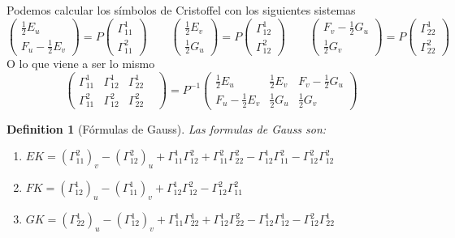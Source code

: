 \documentclass{myclass}
\newtheorem*{definition}{Definition}
\begin{document}
Podemos calcular los símbolos de Cristoffel con los siguientes sistemas
\[
  \begin{pmatrix} \frac{1}{2}E_u \\ F_u-\frac{1}{2}E_v \end{pmatrix}  = P\begin{pmatrix} \Gamma_{11}^1 \\ \Gamma_{11}^2 \end{pmatrix}  \qquad
  \begin{pmatrix} \frac{1}{2}E_v \\ \frac{1}{2}G_u \end{pmatrix}  = P\begin{pmatrix} \Gamma_{12}^1 \\ \Gamma_{12}^2 \end{pmatrix} \qquad 
  \begin{pmatrix} F_v-\frac{1}{2}G_u \\ \frac{1}{2}G_v \end{pmatrix}  = P\begin{pmatrix} \Gamma_{22}^1 \\ \Gamma_{22}^2 \end{pmatrix} 
\] 
O lo que viene a ser lo mismo
\[
  \begin{pmatrix} \Gamma_{11}^1 & \Gamma_{12}^1 & \Gamma_{22}^1 \\ \Gamma_{11}^2 & \Gamma_{12}^2 & \Gamma_{22}^2 &  \end{pmatrix}  = P^{-1} \begin{pmatrix} \frac{1}{2}E_u & \frac{1}{2}E_v & F_v - \frac{1}{2}G_u \\ F_u - \frac{1}{2}E_v & \frac{1}{2}G_u & \frac{1}{2}G_v \end{pmatrix} 
\] 

\begin{definition}[Fórmulas de Gauss] Las formulas de Gauss son:
  \begin{enumerate}[topsep=-6pt, itemsep=0pt]
    \item $EK = (\Gamma_{11}^2)_v - (\Gamma_{12}^2)_u + \Gamma_{11}^1\Gamma_{12}^2 + \Gamma_{11}^2\Gamma_{22}^2 - \Gamma_{12}^1\Gamma_{11}^2 - \Gamma_{12}^2\Gamma_{12}^2$
    \item $FK = (\Gamma_{12}^1)_u - (\Gamma_{11}^1)_v + \Gamma_{12}^1\Gamma_{12}^2 - \Gamma_{12}^2\Gamma_{11}^2$
    \item $GK = (\Gamma_{22}^1)_u - (\Gamma_{12}^1)_v + \Gamma_{11}^1\Gamma_{22}^1 + \Gamma_{12}^1\Gamma_{22}^2 - \Gamma_{12}^1\Gamma_{12}^1 - \Gamma_{12}^2\Gamma_{22}^1$
  \end{enumerate}
\end{definition}
\end{document}
